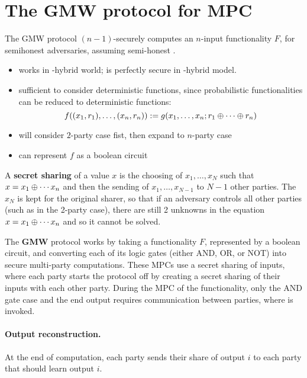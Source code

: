 \section{The GMW protocol for MPC}

The GMW protocol $(n-1)$-securely computes an $n$-input functionality $F$, for semihonest adversaries, assuming semi-honest \OT.
\begin{itemize}
    \item works in \OT-hybrid world; is perfectly secure in \OT-hybrid model.
    \item sufficient to consider deterministic functions, since probabilistic functionalities can be reduced to deterministic functions:
    \[
        f((x_1, r_1), \dots, (x_n, r_n)) := g(x_1, \dots, x_n; r_1 \oplus \cdots \oplus r_n)
    \]
    \item will consider $2$-party case fist, then expand to $n$-party case
    \item can represent $f$ as a boolean circuit
\end{itemize}

\begin{defn}
A \textbf{secret sharing} of a value $x$ is the choosing of $x_1, \dots, x_N$ such that $x = x_1 \oplus \cdots x_n$ and then the sending of $x_1, \dots, x_{N-1}$ to $N-1$ other parties. The $x_N$ is kept for the original sharer, so that if an adversary controls all other parties (such as in the 2-party case), there are still 2 unknowns in the equation $x = x_1 \oplus \cdots x_n$ and so it cannot be solved.
\end{defn}

\begin{prcl}
The \textbf{GMW} protocol works by taking a functionality $F$, represented by a boolean circuit, and converting each of its logic gates (either AND, OR, or NOT) into secure multi-party computations. These MPCs use a secret sharing of inputs, where each party starts the protocol off by creating a secret sharing of their inputs with each other party. During the MPC of the functionality, only the AND gate case and the end output requires communication between parties, where \OT is invoked. 


\paragraph{Output reconstruction.} At the end of computation, each party sends their share of output $i$ to each party that should learn output $i$.
\end{prcl}

